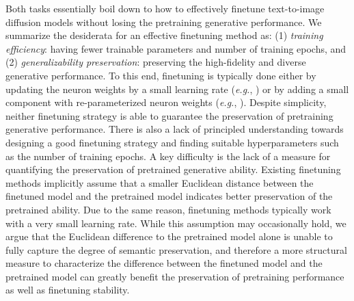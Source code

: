 Both tasks essentially boil down to how to effectively finetune text-to-image diffusion models without losing the pretraining generative performance. We summarize the desiderata for an effective finetuning method as: (1) \emph{training efficiency}: having fewer trainable parameters and number of training epochs, and (2) \emph{generalizability preservation}: preserving the high-fidelity and diverse generative performance. To this end, finetuning is typically done either by updating the neuron weights by a small learning rate (\emph{e.g.}, \cite{ruiz2023dreambooth}) or by adding a small component with re-parameterized neuron weights (\emph{e.g.}, \cite{hulora2022,zhang2023adding}). Despite simplicity, neither finetuning strategy is able to guarantee the preservation of pretraining generative performance. There is also a lack of principled understanding towards designing a good finetuning strategy and finding suitable hyperparameters such as the number of training epochs. A key difficulty is the lack of a measure for quantifying the preservation of pretrained generative ability. Existing finetuning methods implicitly assume that a smaller Euclidean distance between the finetuned model and the pretrained model indicates better preservation of the pretrained ability. Due to the same reason, finetuning methods typically work with a very small learning rate. While this assumption may occasionally hold, we argue that the Euclidean difference to the pretrained model alone is unable to fully capture the degree of semantic preservation, and therefore a more structural measure to characterize the difference between the finetuned model and the pretrained model can greatly benefit the preservation of pretraining performance as well as finetuning stability. 

